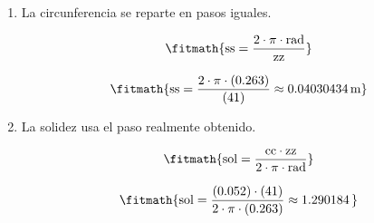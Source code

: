 \begin{enumerate}

\item La circunferencia se reparte en pasos iguales.

\[\fitmath{\mathrm{ss}=\frac{2\cdot \pi\cdot \mathrm{rad}}{\mathrm{zz}}}\]

\[\fitmath{\mathrm{ss}=\frac{2\cdot \pi\cdot (0.263)}{(41)}\approx 0.04030434\,\mathrm{m}}\]

\item La solidez usa el paso realmente obtenido.

\[\fitmath{\mathrm{sol}=\frac{\mathrm{cc}\cdot \mathrm{zz}}{2\cdot \pi\cdot \mathrm{rad}}}\]

\[\fitmath{\mathrm{sol}=\frac{(0.052)\cdot (41)}{2\cdot \pi\cdot (0.263)}\approx 1.290184\,}\]

\end{enumerate}
